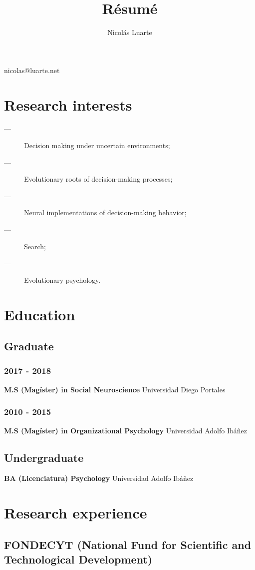 \documentclass{article}
\makeatletter
\renewcommand{\maketitle}{
\begin{center}
{\huge\bfseries
\theauthor}

\vspace{.25em}

nicolas@luarte.net

\end{center}
}
\makeatother
\begin{document}
\title{R\'esum\'e}
\author{Nicol\'as Luarte}


\maketitle
\section{Research interests}
\vspace{.90em}
\begin{description}
    \item[---]Decision making under uncertain environments;
    \item[---]Evolutionary roots of decision-making processes;
    \item[---]Neural implementations of decision-making behavior;
    \item[---]Search;
    \item[---]Evolutionary psychology.
\end{description}   
\section{Education}
\subsection{Graduate}\vspace{.90em}
\subsubsection{2017 -  2018}
\textbf{M.S (Mag\'ister) in Social Neuroscience} Universidad Diego Portales 
\subsubsection{2010 - 2015}
\textbf{M.S (Mag\'ister) in Organizational Psychology} Universidad Adolfo Ib\'a\~nez
\subsection{Undergraduate}\vspace{.90em}
\textbf{BA (Licenciatura) Psychology} Universidad Adolfo Ib\'a\~nez 
\section{Research experience}
\subsection{FONDECYT {\small(National Fund for Scientific and Technological Development)}}
\end{document}
